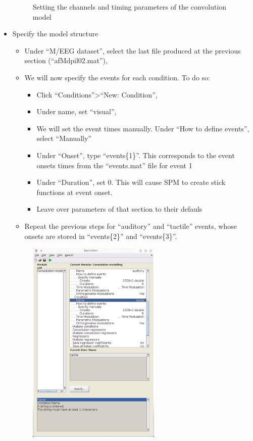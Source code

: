 \begin{itemize}
\begin{figure}[htb]
			 	\caption{Setting the channels and timing parameters of the convolution model}
			 	\label{fig:meeg-firstlevel:conv-top}
			 \end{figure}
			\item Specify the model structure
			\begin{itemize}
				\item Under ``M/EEG dataset'', select the last file produced at the previous section (``afMdpil02.mat''),
				\item We will now specify the events for each condition. To do so: 
				\begin{itemize}
					\item Click ``Conditions''\textgreater ``New: Condition'', 
					\item Under name, set ``visual'', 
					\item We will set the event times manually. Under ``How to define events'', select ``Manually''
					\item Under ``Onset'', type ``events\{1\}''. This corresponds to the event onsets times from the ``events.mat'' file for event 1
					\item Under ``Duration'', set 0. This will cause SPM to create stick functions at event onset. 
					\item Leave over parameters of that section to their defauls
				\end{itemize}
				\item Repeat the previous steps for  ``auditory'' and ``tactile'' events, whose onsets are stored in ``events\{2\}'' and ``events\{3\}''.
			\end{itemize}
			\begin{figure}[htb]
			 	\centering
			 	\includegraphics[width=0.6\textwidth]{meeg_firstlevel/figures/conv-other-conds.png}

\end{figure}
\end{itemize}
